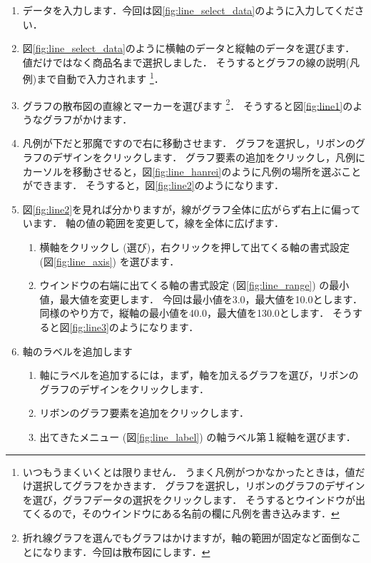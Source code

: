 \begin{enumerate}
    \item データを入力します．今回は図\ref{fig:line_select_data}のように入力してください．
    \item 図\ref{fig:line_select_data}のように横軸のデータと縦軸のデータを選びます．
    値だけではなく商品名まで選択しました．
    そうするとグラフの線の説明(凡例)まで自動で入力されます
    \footnote{いつもうまくいくとは限りません．
      うまく凡例がつかなかったときは，値だけ選択してグラフをかきます．
      グラフを選択し，リボンのグラフのデザインを選び，グラフデータの選択をクリックします．
      そうするとウインドウが出てくるので，そのウインドウにある名前の欄に凡例を書き込みます．}．
    \item グラフの散布図の直線とマーカーを選びます
    \footnote{折れ線グラフを選んでもグラフはかけますが，軸の範囲が固定など面倒なことになります．今回は散布図にします．}．
    そうすると図\ref{fig:line1}のようなグラフがかけます．
    \item 凡例が下だと邪魔ですので右に移動させます．
    グラフを選択し，リボンのグラフのデザインをクリックします．
    グラフ要素の追加をクリックし，凡例にカーソルを移動させると，図\ref{fig:line_hanrei}のように凡例の場所を選ぶことができます．
    そうすると，図\ref{fig:line2}のようになります．
    \item 図\ref{fig:line2}を見れば分かりますが，線がグラフ全体に広がらず右上に偏っています．
    軸の値の範囲を変更して，線を全体に広げます．
    \begin{enumerate}
        \item 横軸をクリックし (選び)，右クリックを押して出てくる軸の書式設定 (図\ref{fig:line_axis}) を選びます．
        \item ウインドウの右端に出てくる軸の書式設定 (図\ref{fig:line_range}) の最小値，最大値を変更します．
        今回は最小値を3.0，最大値を10.0とします．
        同様のやり方で，縦軸の最小値を40.0，最大値を130.0とします．
        そうすると図\ref{fig:line3}のようになります．
    \end{enumerate}
    \item 軸のラベルを追加します
    \begin{enumerate}
        \item 軸にラベルを追加するには，まず，軸を加えるグラフを選び，リボンのグラフのデザインをクリックします．
        \item リボンのグラフ要素を追加をクリックします．
        \item 出てきたメニュー (図\ref{fig:line_label}) の軸ラベル第１縦軸を選びます．

\end{enumerate}
\end{enumerate}
